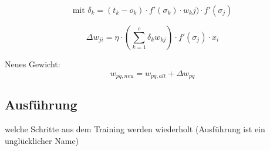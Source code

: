 \begin{equation}
\mbox{mit } \delta_k = (t_k-o_k)\cdot f'(\sigma_k)\cdot w_kj) \cdot f'(\sigma_j)
\end{equation}

\begin{equation}
\Delta w_{ji}=\eta \cdot \left(\sum_{k=1}^{c} \delta_k w_{kj}\right)\cdot f'(\sigma_j)\cdot x_i
\end{equation}


Neues Gewicht:
\begin{equation}
w_{pq, neu}=w_{pq, alt}+\Delta w_{pq}
\end{equation}




\subsection{Ausführung}
welche Schritte aus dem Training werden wiederholt
(Ausführung ist ein unglücklicher Name)